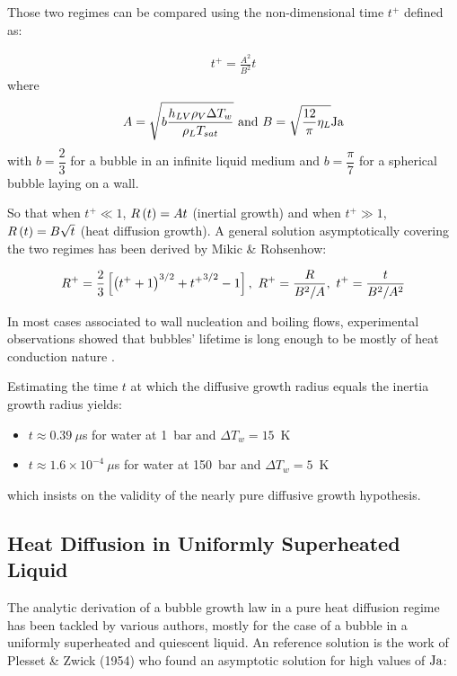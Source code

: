 Those two regimes can be compared using the non-dimensional time $t^{+}$ defined as:

\begin{align}
t^{+} = \frac{A^{2}}{B^{2}}t
\end{align}
where
\begin{equation}
A=\sqrt{b \frac{h_{LV}\rho_{V} \Delta T_{w} }{\rho_{L}T_{sat}} } \ \text{and}\ B=\sqrt{\frac{12}{\pi}\eta_{L}}\Ja
\end{equation}
with $b=\dfrac{2}{3}$ for a bubble in an infinite liquid medium and $b=\dfrac{\pi}{7}$ for a spherical bubble laying on a wall.

\npar

So that when $t^{+} \ll 1$, $R\left( t \right) = At$ (inertial growth) and when $t^{+} \gg 1$, $R\left( t \right)=B\sqrt{t}$ (heat diffusion growth). A general solution asymptotically covering the two regimes has been derived by Mikic \& Rohsenhow:

\begin{equation}
R^{+} = \frac{2}{3}\crocht{\parth{t^{+}+1}^{3/2}+{t^{+}}^{3/2}-1},\ R^{+}=\frac{R}{B^{2}/A},\ t^{+}=\frac{t}{B^{2}/A^{2}}
\end{equation}


In most cases associated to wall nucleation and boiling flows, experimental observations showed that bubbles' lifetime is long enough to be mostly of heat conduction nature \cite{kossolapov_experimental_2021, maity_effect_2000, zhou_experimental_2020}.

\begin{remark*}{}
Estimating the time $t$ at which the diffusive growth radius equals the inertia growth radius yields:
\begin{itemize}
\item $t\approx 0.39\ \mu$s for water at 1\ bar and $\Delta T_{w}=15$\ K
\item $t\approx 1.6\times 10^{-4}\ \mu$s for water at 150\ bar and $\Delta T_{w}=5$\ K
\end{itemize}
which insists on the validity of the nearly pure diffusive growth hypothesis.
\end{remark*}

\subsection{Heat Diffusion in Uniformly Superheated Liquid}

The analytic derivation of a bubble growth law in a pure heat diffusion regime has been tackled by various authors, mostly for the case of a bubble in a uniformly superheated and quiescent liquid. An reference solution is the work of Plesset \& Zwick (1954) \cite{plesset_growth_1954} who found an asymptotic solution for high values of $\mathrm{Ja}$:

